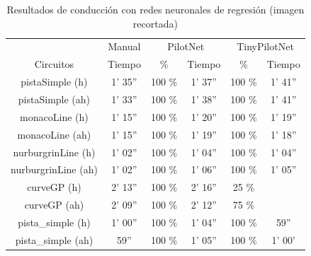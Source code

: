 \begin{table}[H]
\centering
\caption{Resultados de conducción con redes neuronales de regresión (imagen recortada)}
\label{resultados_regresion_recortada}
\begin{tabular}{c|c|c|c|c|c|}
\cline{2-6}
                          & \multicolumn{1}{c|}{Manual} & \multicolumn{2}{c|}{PilotNet} & \multicolumn{2}{c|}{TinyPilotNet} \\ \cline{1-6} 
                        \multicolumn{1}{|c|}{Circuitos}    & Tiempo       & \%       & Tiempo       & \%        & Tiempo         \\ \hline
\multicolumn{1}{|c|}{pistaSimple (h)}    & 1' 35''           & 100 \%         & 1' 37''       &  100 \%        & 1' 41''               \\ \hline
\multicolumn{1}{|c|}{pistaSimple (ah)}     & 1' 33''           & 100 \%          & 1' 38''           & 100 \%        & 1' 41''      \\ \hline
\multicolumn{1}{|c|}{monacoLine (h)}      & 1' 15''           & 100 \%            & 1' 20''            & 100 \%         & 1' 19''                \\ \hline
\multicolumn{1}{|c|}{monacoLine (ah)}       & 1' 15''       &  100 \%      & 1' 19''         & 100 \%          & 1' 18''         \\ \hline
\multicolumn{1}{|c|}{nurburgrinLine (h)}      & 1' 02''       &  100 \%         & 1' 04''           & 100 \%        & 1' 04''       \\ \hline
\multicolumn{1}{|c|}{nurburgrinLine (ah)}       & 1' 02''     & 100 \%         & 1' 06''          & 100 \%     & 1' 05''            \\ \hline
\multicolumn{1}{|c|}{curveGP (h)}     & 2' 13''           & 100 \%         & 2' 16''            & 25 \%        &              \\ \hline
\multicolumn{1}{|c|}{curveGP (ah)}       & 2' 09''            & 100 \%         & 2' 12''        & 75 \%        &         \\ \hline
\multicolumn{1}{|c|}{pista\_simple (h)}       & 1' 00''           & 100 \%       & 1' 04''            & 100 \%         & 59''        \\ \hline
\multicolumn{1}{|c|}{pista\_simple (ah)}     & 59''          & 100 \%       & 1' 05''         & 100 \%        & 1' 00'                 \\ \hline
\end{tabular}
\end{table}


